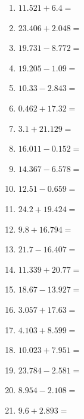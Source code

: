 \documentclass[12pt]{article}
\begin{document}
\begin{enumerate}
\item \large $ 11.521 + 6.4 = $ \vspace{1.5cm}
\newpage
\item \large $ 23.406 + 2.048 = $ \vspace{1.5cm}
\item \large $ 19.731 - 8.772 = $ \vspace{1.5cm}
\item \large $ 19.205 - 1.09 = $ \vspace{1.5cm}
\item \large $ 10.33 - 2.843 = $ \vspace{1.5cm}
\item \large $ 0.462 + 17.32 = $ \vspace{1.5cm}
\item \large $ 3.1 + 21.129 = $ \vspace{1.5cm}
\item \large $ 16.011 - 0.152 = $ \vspace{1.5cm}
\item \large $ 14.367 - 6.578 = $ \vspace{1.5cm}
\item \large $ 12.51 - 0.659 = $ \vspace{1.5cm}
\item \large $ 24.2 + 19.424 = $ \vspace{1.5cm}
\newpage
\item \large $ 9.8 + 16.794 = $ \vspace{1.5cm}
\item \large $ 21.7 - 16.407 = $ \vspace{1.5cm}
\item \large $ 11.339 + 20.77 = $ \vspace{1.5cm}
\item \large $ 18.67 - 13.927 = $ \vspace{1.5cm}
\item \large $ 3.057 + 17.63 = $ \vspace{1.5cm}
\item \large $ 4.103 + 8.599 = $ \vspace{1.5cm}
\item \large $ 10.023 + 7.951 = $ \vspace{1.5cm}
\item \large $ 23.784 - 2.581 = $ \vspace{1.5cm}
\item \large $ 8.954 - 2.108 = $ \vspace{1.5cm}
\item \large $ 9.6 + 2.893 = $ \vspace{1.5cm}

\end{enumerate}
\end{document}
